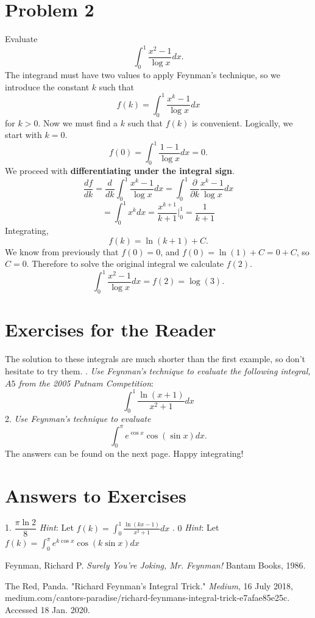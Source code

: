 \documentclass{article}
\begin{document}
\section*{Problem 2}
Evaluate $$\int_{0}^{1}\frac{x^2-1}{\log{x}}dx.$$
The integrand must have two values to apply Feynman's technique, so we introduce the constant $k$ such that
$$f(k) = \int_{0}^{1}\frac{x^k-1}{\log{x}}dx$$ for $k>0$. Now we must find a $k$ such that $f(k)$ is convenient. Logically, we start with $k=0$. 
$$f(0)=\int_{0}^{1}\frac{1-1}{\log{x}}dx = 0.$$
\newline We proceed with \textbf{differentiating under the integral sign}.
$$\frac{df}{dk} = \frac{d}{dk}\int_{0}^{1}\frac{x^k-1}{\log{x}}dx = \int_{0}^{1}\frac{\partial}{\partial k}\frac{x^k-1}{\log{x}}dx$$
$$= \int_{0}^{1}x^kdx = \frac{x^{k+1}}{k+1}\bigg\vert_{0}^{1} = \frac{1}{k+1}$$
Integrating,
$$f(k)=\ln({k+1})+C.$$
We know from previously that $f(0)=0$, and $f(0)=\ln(1)+C=0+C$, so $C=0$. Therefore to solve the original integral we calculate $f(2)$.
$$\int_{0}^{1}\frac{x^2-1}{\log{x}}dx = f(2) = \boxed{\log({3})}.$$

\section*{Exercises for the Reader}
The solution to these integrals are much shorter than the first example, so don't hesitate to try them.
\newline {}. \textit{Use Feynman's technique to evaluate the following integral, $A5$ from the 2005 Putnam Competition}:
$$\int_{0}^{1}\frac{\ln(x+1)}{x^2+1}dx$$
2. \textit{Use Feynman's technique to evaluate}
$$\int_{0}^{\pi}e^{\cos{x}}\cos{(\sin{x})}dx.$$
The answers can be found on the next page. Happy integrating!

\newpage
\section*{Answers to Exercises}
1. $\boxed{\dfrac{\pi\ln{2}}{8}}$
\newline \textit{Hint}: Let $\displaystyle{f(k)=\int_{0}^{1}\frac{\ln({kx-1})}{x^2+1}}dx$
\newline {}. $\boxed{0}$
\newline \textit{Hint}: Let $\displaystyle{f(k)=\int_{0}^{\pi}e^{k\cos{x}}\cos({k\sin{x}})}dx$
\begin{thebibliography}{2}
Feynman, Richard P.
\textit{Surely You're Joking, Mr. Feynman!}
Bantam Books, 1986.

The Red, Panda. "Richard Feynman's Integral Trick." 
\textit{Medium}, 16 July 2018, medium.com/cantors-paradise/richard-feynmans-integral-trick-e7afae85e25c. Accessed 18 Jan. 2020.
\end{thebibliography}
\end{document}
